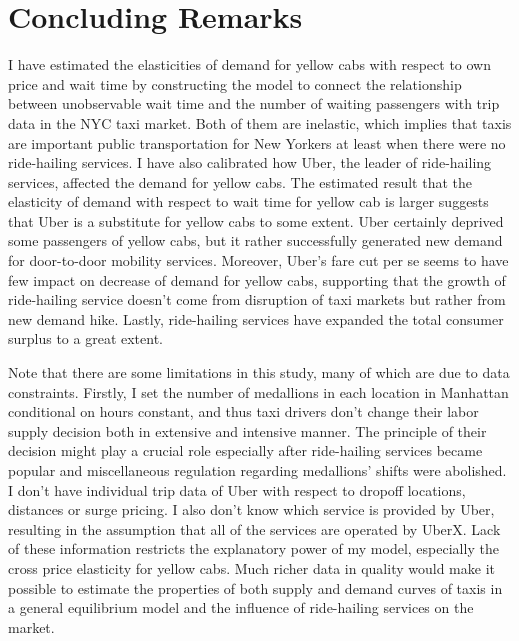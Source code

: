 \vspace{1.0cm}
\section{Concluding Remarks}
\hspace{0.5cm} I have estimated the elasticities of demand for yellow cabs with respect to own price and wait time by constructing the model to connect the relationship between unobservable wait time and the number of waiting passengers with trip data in the NYC taxi market. Both of them are inelastic, which implies that taxis are important public transportation for New Yorkers at least when there were no ride-hailing services. I have also calibrated how Uber, the leader of ride-hailing services, affected the demand for yellow cabs. The estimated result that the elasticity of demand with respect to wait time for yellow cab is larger suggests that Uber is a substitute for yellow cabs to some extent. Uber certainly deprived some passengers of yellow cabs, but it rather successfully generated new demand for door-to-door mobility services. Moreover, Uber's fare cut per se seems to have few impact on decrease of demand for yellow cabs, supporting that the growth of ride-hailing service doesn't come from disruption of taxi markets but rather from new demand hike. Lastly, ride-hailing services have expanded the total consumer surplus to a great extent.

Note that there are some limitations in this study, many of which are due to data constraints. Firstly, I set the number of medallions in each location in Manhattan conditional on hours constant, and thus taxi drivers don't change their labor supply decision both in extensive and intensive manner. The principle of their decision might play a crucial role especially after ride-hailing services became popular and miscellaneous regulation regarding medallions' shifts were abolished. I don't have individual trip data of Uber with respect to dropoff locations, distances or surge pricing. I also don't know which service is provided by Uber, resulting in the assumption that all of the services are operated by UberX. Lack of these information restricts the explanatory power of my model, especially the cross price elasticity for yellow cabs. Much richer data in quality would make it possible to estimate the properties of both supply and demand curves of taxis in a general equilibrium model and the influence of ride-hailing services on the market.


\vspace{1.0cm}
